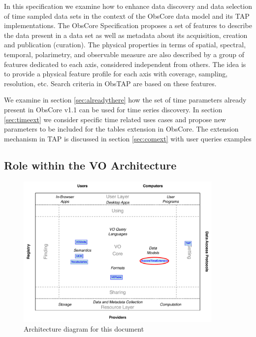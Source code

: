 \documentclass[11pt,a4paper]{ivoa}
\begin{document}
In this specification we examine how to enhance data discovery and data selection of time sampled data sets in the context of the ObsCore data model and its TAP implementations.
The ObsCore Specification \cite{2017ivoa.spec.0509L} proposes a set of features to describe the data present in a data set as well as metadata about its acquisition, creation and publication (curation).
The physical properties in terms of spatial, spectral, temporal, polarimetry, and observable measure  are also described by a group of features dedicated to each axis, considered independent from others. The idea is to provide a physical feature profile for each axis with coverage, sampling, resolution, etc.
Search criteria in ObsTAP  are based on these features.

We examine in section \ref{sec:alreadythere} how the set of time parameters already present in ObsCore v1.1 can be used for time series discovery.
In section \ref{sec:timeext} we consider specific time related uses cases and propose new parameters to be included for the tables extension in ObsCore.
The extension mechanism in TAP is discussed  in section \ref{sec:comext} with user queries examples

\subsection{Role within the VO Architecture}

\begin{figure}
\centering


\includegraphics[width=0.9\textwidth]{role_diagram.pdf}
\caption{Architecture diagram for this document}
\label{fig:archdiag}
\end{figure}
\end{document}

